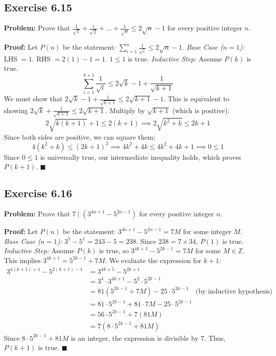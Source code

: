 \documentclass[11pt, a4paper]{article}
\theoremstyle{definition}
\theoremstyle{remark}
\newcommand{\Z}{\mathbb{Z}}
\begin{document}
\subsection*{Exercise 6.15}
\textbf{Problem:} Prove that $\frac{1}{\sqrt{1}} + \frac{1}{\sqrt{2}} + \dots + \frac{1}{\sqrt{n}} \le 2\sqrt{n} - 1$ for every positive integer $n$.

\textbf{Proof:}
Let $P(n)$ be the statement: $\sum_{i=1}^n \frac{1}{\sqrt{i}} \le 2\sqrt{n} - 1$.
\textit{Base Case ($n=1$):} LHS $= 1$. RHS $= 2(1) - 1 = 1$. $1 \le 1$ is true.
\textit{Inductive Step:} Assume $P(k)$ is true.
\[
\sum_{i=1}^{k+1} \frac{1}{\sqrt{i}} \le 2\sqrt{k} - 1 + \frac{1}{\sqrt{k+1}}
\]
We must show that $2\sqrt{k} - 1 + \frac{1}{\sqrt{k+1}} \le 2\sqrt{k+1} - 1$.
This is equivalent to showing $2\sqrt{k} + \frac{1}{\sqrt{k+1}} \le 2\sqrt{k+1}$.
Multiply by $\sqrt{k+1}$ (which is positive):
\[
2\sqrt{k(k+1)} + 1 \le 2(k+1) \implies 2\sqrt{k^2+k} \le 2k + 1
\]
Since both sides are positive, we can square them:
\[
4(k^2+k) \le (2k+1)^2 \implies 4k^2 + 4k \le 4k^2 + 4k + 1 \implies 0 \le 1
\]
Since $0 \le 1$ is universally true, our intermediate inequality holds, which proves $P(k+1)$. \hfill $\blacksquare$

\subsection*{Exercise 6.16}
\textbf{Problem:} Prove that $7 \mid (3^{4n+1} - 5^{2n-1})$ for every positive integer $n$.

\textbf{Proof:}
Let $P(n)$ be the statement: $3^{4n+1} - 5^{2n-1} = 7M$ for some integer $M$.
\textit{Base Case ($n=1$):} $3^5 - 5^1 = 243 - 5 = 238$. Since $238 = 7 \times 34$, $P(1)$ is true.
\textit{Inductive Step:} Assume $P(k)$ is true, so $3^{4k+1} - 5^{2k-1} = 7M$ for some $M \in \Z$. This implies $3^{4k+1} = 5^{2k-1} + 7M$.
We evaluate the expression for $k+1$:
\[
\begin{aligned}
3^{4(k+1)+1} - 5^{2(k+1)-1} &= 3^{4k+5} - 5^{2k+1} \\
&= 3^4 \cdot 3^{4k+1} - 5^2 \cdot 5^{2k-1} \\
&= 81(5^{2k-1} + 7M) - 25 \cdot 5^{2k-1} \quad \text{(by inductive hypothesis)} \\
&= 81 \cdot 5^{2k-1} + 81 \cdot 7M - 25 \cdot 5^{2k-1} \\
&= 56 \cdot 5^{2k-1} + 7(81M) \\
&= 7 \left( 8 \cdot 5^{2k-1} + 81M \right)
\end{aligned}
\]
Since $8 \cdot 5^{2k-1} + 81M$ is an integer, the expression is divisible by 7. Thus, $P(k+1)$ is true. \hfill $\blacksquare$
\end{document}
